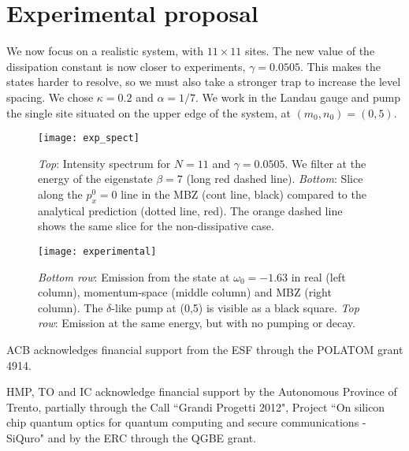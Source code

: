 \documentclass[twocolumn, 10pt, aps, superscriptaddress, floatfix, showpacs, prb, citeautoscript]{revtex4-1}
\begin{document}
\section{Experimental proposal}
\label{sec:experiment}

We now focus on a realistic system, with $11 \times 11$ sites. The new
value of the dissipation constant is now closer to experiments,
$\gamma = 0.0505$. This makes the states harder to resolve, so we must
also take a stronger trap to increase the level spacing. We chose
$\kappa = 0.2$ and $\alpha = 1/7$. We work in the Landau gauge and
pump the single site situated on the upper edge of the system, at
$(m_0,n_0)= (0,5)$.

\begin{figure}[htb]
  \centerline{\texttt{[image: exp\_spect]}}
  \caption{\emph{Top}: Intensity spectrum for $N=11$ and $\gamma = 0.0505$. We filter at the energy of the eigenstate $\beta=7$ (long red dashed line).
\emph{Bottom}: Slice along the $p_x^0 = 0$ line in the MBZ (cont line, black) compared to the analytical prediction (dotted line, red). The orange dashed line shows the same slice for the non-dissipative case.}
  \label{fig:exp_spectrum}
\end{figure}


\begin{figure}[htb]
  \centerline{\texttt{[image: experimental]}}
  \caption{\emph{Bottom row}: Emission from the state at $\omega_0 =
-1.63$ in real (left column), momentum-space (middle column) and MBZ
(right column). The $\delta$-like pump at (0,5) is visible as a black
square.  \emph{Top row}: Emission at the same energy, but with no
pumping or decay.}
  \label{fig:exp_states}
\end{figure}




\acknowledgments

ACB acknowledges financial support from the ESF through the POLATOM grant 4914.

HMP, TO and IC acknowledge financial support by the Autonomous Province of Trento, partially through the Call ``Grandi Progetti 2012", Project ``On silicon chip quantum optics for quantum computing and secure communications - SiQuro" and by the ERC through the QGBE grant.




\appendix
\end{document}
